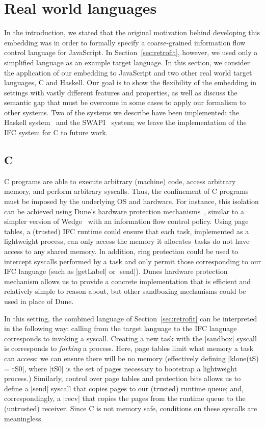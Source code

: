 \section{Real world languages}
\label{sec:real}

In the introduction, we stated that the original motivation behind
developing this embedding was in order to formally specify a
coarse-grained information flow control language for JavaScript.
%
In Section~\ref{sec:retrofit}, however, we used only a simplified
language as an example target language.
%
In this section, we consider the application of our embedding to
JavaScript and two other real world target languages, C and Haskell.
%
Our goal is to show the flexibility of the embedding in settings with
vastly different features and properties, as well as discuss the
semantic gap that must be overcome in some cases to apply our formalism
to other systems.
%
Two of the systems we describe have been implemented: the Haskell
system~\cite{lio} and the SWAPI~\tocite{} system; we leave the
implementation of the IFC system for C to future work.

\subsection{C}
\label{sec:real:c}
%
C programs are able to execute arbitrary (machine) code, access
arbitrary memory, and perform arbitrary syscalls.
%
Thus, the confinement of C programs must be imposed by the underlying OS
and hardware.
%
For instance, this isolation can be achieved using Dune's hardware protection
mechanisms~\cite{Belay:2012:DSU:2387880.2387913}, similar to a simpler
version of Wedge~\cite{Belay:2012:DSU:2387880.2387913,
Bittau:2008:WSA:1387589.1387611} with an information flow control
policy.
%
Using page tables, a (trusted) IFC runtime could ensure that each task,
implemented as a lightweight process, can only access the memory it
allocates--tasks do not have access to any shared memory.
%
In addition, ring protection could be used to intercept syscalls performed by
a task and only permit those corresponding to our IFC language (such as
|getLabel| or |send|).
%
Dunes hardware protection mechanism allows us to provide a concrete
implementation that is efficient and relatively simple to reason
about, but other sandboxing mechanisms could be used in place of Dune.

In this setting, the combined language of Section~\ref{sec:retrofit}
can be interpreted in the following way: calling from the target
language to the IFC language corresponds to invoking a syscall.
%
Creating a new task with the |sandbox| syscall is corresponds to
\emph{forking} a process.  Here, page tables limit what memory
a task can access: we can ensure there will be no memory (effectively
defining |klone(tS)
= tS0|, where |tS0| is the set of pages necessary to bootstrap a
lightweight process.)
%
Similarly, control over page tables and protection bits allows us to
define a |send| syscall that copies pages to our
(trusted) runtime queue; and, correspondingly, a |recv| that copies
the pages from the runtime queue to the (untrusted) receiver.
%
Since C is not memory safe, conditions on these syscalls are
meaningless.


